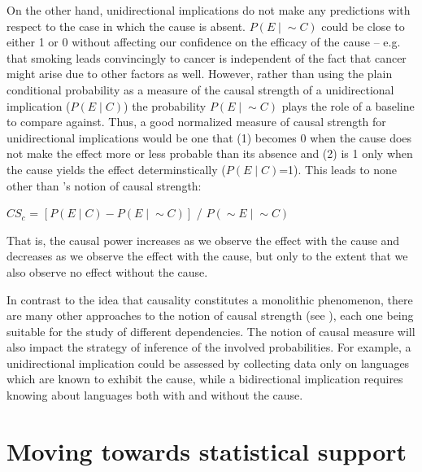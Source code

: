 \documentclass[output=paper]{langsci/langscibook}
\begin{document}
On the other hand, unidirectional implications do not make any predictions with respect to the case in which the cause is absent. $P(E{\mid}{}{\sim}C)$ could be close to either 1 or 0 without affecting our confidence on the efficacy of the cause -- e.g. that smoking leads convincingly to cancer is independent of the fact that cancer might arise due to other factors as well. However, rather than using the plain conditional probability as a measure of the causal strength of a unidirectional implication ($P(E{\mid}{}C)$) the probability $P(E{\mid}{}{\sim}C)$ plays the role of a baseline to compare against. Thus, a good normalized measure of causal strength for unidirectional implications would be one that (1) becomes 0 when the cause does not make the effect more or less probable than its absence and (2) is 1 only when the cause yields the effect determinstically ($P(E{\mid}{}C)$=1). This leads to none other than \cite{cheng1997covariation}'s notion of causal strength:  

\ea
$CS_c$ = $\left[P(E{\mid}{}C) - P(E{\mid}{}{\sim}C)\right]$ / $P({\sim}E{\mid}{}{\sim}C)$
\z

That is, the causal power increases as we observe the effect with the cause and decreases as we observe the effect with the cause, but only to the extent that we also observe no effect without the cause.  

  In contrast to the idea that causality constitutes a monolithic phenomenon, there are many other approaches to the notion of causal strength (see  \citealt{fitelson2011probabilistic}), each one being suitable for the study of different dependencies.   The notion of causal measure will also impact the strategy of inference of the involved probabilities. For example, a unidirectional implication could be assessed by collecting data only on languages which are known to exhibit the cause, while a bidirectional implication requires knowing about languages both with and without the cause. 

\section{Moving towards statistical support}
\end{document}
